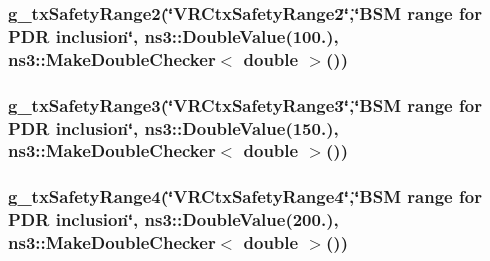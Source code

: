 \subsubsection[{\texorpdfstring{g\+\_\+tx\+Safety\+Range2}{g_txSafetyRange2}}]{ g\+\_\+tx\+Safety\+Range2(\char`\"{}V\+R\+Ctx\+Safety\+Range2\char`\"{},\char`\"{}B\+SM range for P\+DR inclusion\char`\"{}, ns3\+::\+Double\+Value(100.), {\bf ns3\+::\+Make\+Double\+Checker}$<$ double $>$())\hspace{0.3cm}{\ttfamily [static]}}\hypertarget{vanet-routing-compare_8cc_a2aa368ab5b1472c39d9fd72091056f94}{}\label{vanet-routing-compare_8cc_a2aa368ab5b1472c39d9fd72091056f94}
\subsubsection[{\texorpdfstring{g\+\_\+tx\+Safety\+Range3}{g_txSafetyRange3}}]{ g\+\_\+tx\+Safety\+Range3(\char`\"{}V\+R\+Ctx\+Safety\+Range3\char`\"{},\char`\"{}B\+SM range for P\+DR inclusion\char`\"{}, ns3\+::\+Double\+Value(150.), {\bf ns3\+::\+Make\+Double\+Checker}$<$ double $>$())\hspace{0.3cm}{\ttfamily [static]}}\hypertarget{vanet-routing-compare_8cc_a5f3119c94f9177355890bc0bf8edfd76}{}\label{vanet-routing-compare_8cc_a5f3119c94f9177355890bc0bf8edfd76}
\subsubsection[{\texorpdfstring{g\+\_\+tx\+Safety\+Range4}{g_txSafetyRange4}}]{ g\+\_\+tx\+Safety\+Range4(\char`\"{}V\+R\+Ctx\+Safety\+Range4\char`\"{},\char`\"{}B\+SM range for P\+DR inclusion\char`\"{}, ns3\+::\+Double\+Value(200.), {\bf ns3\+::\+Make\+Double\+Checker}$<$ double $>$())\hspace{0.3cm}{\ttfamily [static]}}\hypertarget{vanet-routing-compare_8cc_a95eb3404e21982cf67b8704827334dac}{}\label{vanet-routing-compare_8cc_a95eb3404e21982cf67b8704827334dac}
